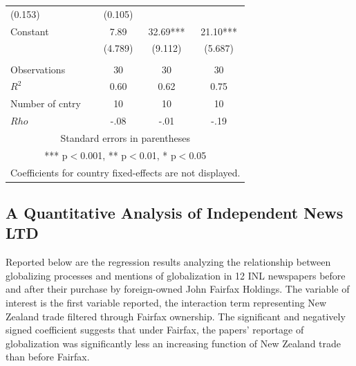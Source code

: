 \documentclass[12pt]{report}
\begin{document}
\begin{table}[htdp]
\begin{center}
{\begin{tabular}{lccc}
(0.153) & (0.105) \\
Constant & 7.89 & 32.69*** & 21.10*** \\  & (4.789) &
(9.112) & (5.687) \\
 &  &  &
 \\ Observations & 30 & 30 & 30 \\ $R^2$ & 0.60 & 0.62 & 0.75
\\ Number of cntry & 10 & 10 & 10 \\  $Rho$ & -.08 & -.01 & -.19 \\ \hline
\multicolumn{4}{c}{ Standard errors in parentheses} \\
\multicolumn{4}{c}{ *** p$<$0.001, ** p$<$0.01, * p$<$0.05} \\
\multicolumn{4}{c}{ Coefficients for country fixed-effects are not displayed.
} \\ \end{tabular}
} \end{center}
\label{default}
\end{table}

\pagebreak

\subsection{A Quantitative Analysis of Independent News LTD} Reported below are the regression
results analyzing the relationship between globalizing processes and mentions of globalization in 12
INL newspapers before and after their purchase by foreign-owned John Fairfax Holdings. The variable
of interest is the first variable reported, the interaction term representing New Zealand trade
filtered through Fairfax ownership. The significant and negatively signed coefficient suggests that
under Fairfax, the papers' reportage of globalization was significantly less an increasing function
of New Zealand trade than before Fairfax.
\end{document}
